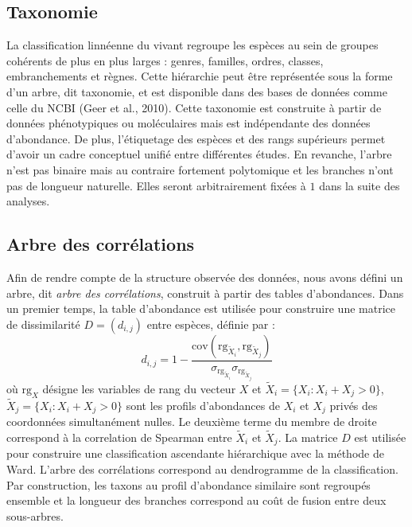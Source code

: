 \documentclass[12pt,a4paper]{reedthesis}
\theoremstyle{definition}
\theoremstyle{definition}
\theoremstyle{definition}
\theoremstyle{remark}
\begin{document}
\hypertarget{taxonomie}{%
\subsection{Taxonomie}\label{taxonomie}}

La classification linnéenne du vivant regroupe les espèces au sein de groupes cohérents de plus en plus larges : genres, familles, ordres, classes, embranchements et règnes. Cette hiérarchie peut être représentée sous la forme d'un arbre, dit taxonomie, et est disponible dans des bases de données comme celle du NCBI (Geer et al., 2010). Cette taxonomie est construite à partir de données phénotypiques ou moléculaires mais est indépendante des données d'abondance. De plus, l'étiquetage des espèces et des rangs supérieurs permet d'avoir un cadre conceptuel unifié entre différentes études. En revanche, l'arbre n'est pas binaire mais au contraire fortement polytomique et les branches n'ont pas de longueur naturelle. Elles seront arbitrairement fixées à \(1\) dans la suite des analyses.

\hypertarget{cortree}{%
\subsection{Arbre des corrélations}\label{cortree}}

Afin de rendre compte de la structure observée des données, nous avons défini un arbre, dit \emph{arbre des corrélations}, construit à partir des tables d'abondances. Dans un premier temps, la table d'abondance est utilisée pour construire une matrice de dissimilarité \(D = (d_{i,j})\) entre espèces, définie par :
\begin{equation*}
d_{i,j} = 1 - \frac{\text{cov}(\text{rg}_{\tilde{X}_i}, \text{rg}_{\tilde{X}_j})}{\sigma_{\text{rg}_{\tilde{X}_i}} \sigma_{\text{rg}_{\tilde{X}_j}}}
\end{equation*}
où \(\text{rg}_X\) désigne les variables de rang du vecteur \(X\) et \(\tilde{X}_{i} = \{X_i: X_i + X_j > 0\}\), \(\tilde{X}_{j} = \{X_i: X_i + X_j > 0\}\) sont les profils d'abondances de \(X_i\) et \(X_j\) privés des coordonnées simultanément nulles. Le deuxième terme du membre de droite correspond à la correlation de Spearman entre \(\tilde{X}_{i}\) et \(\tilde{X}_{j}\). La matrice \(D\) est utilisée pour construire une classification ascendante hiérarchique avec la méthode de Ward. L'arbre des corrélations correspond au dendrogramme de la classification. Par construction, les taxons au profil d'abondance similaire sont regroupés ensemble et la longueur des branches correspond au coût de fusion entre deux sous-arbres.
\end{document}
